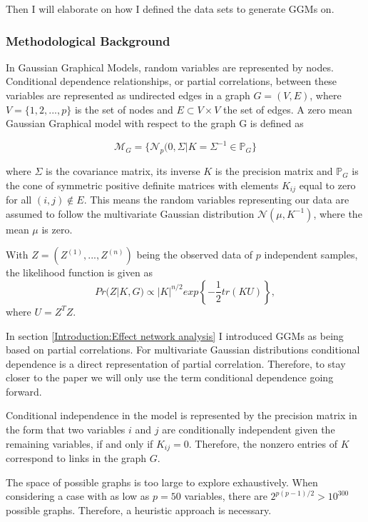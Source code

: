 \documentclass[a4paper,12pt,twoside,openright]{article}
\begin{document}
Then I will elaborate on how I defined the data sets to generate GGMs on.

\subsubsection{Methodological Background}
In Gaussian Graphical Models, random variables are represented by nodes. Conditional dependence relationships, or partial correlations,  between these variables are represented as undirected edges in a graph $G=(V,E)$, where $V=\{1,2, ..., p\}$ is the set of nodes and $E \subset V \times V$ the set of edges. A zero mean Gaussian Graphical model with respect to the graph G is defined as

\begin{equation}
\mathcal{M}_G = \lbrace \mathcal{N}_p(0,\Sigma|K = \Sigma^{-1} \in \mathbb{P}_G \rbrace
\end{equation}

where $\Sigma$ is the covariance matrix, its inverse $K$ is the precision matrix and $\mathbb{P}_G$ is the cone of symmetric positive definite matrices with elements $K_{ij}$ equal to zero for all $(i,j)\notin E$. This means the random variables representing our data are assumed to follow the multivariate Gaussian distribution $\mathcal{N}(\mu, K^{-1})$, where the mean $\mu$ is zero.

With $Z = (Z^{(1)}, ..., Z^{(n)})$ being the observed data of $p$ independent samples, the likelihood function is given as
\begin{equation}
Pr(Z|K,G) \propto |K|^{n/2} exp\left\lbrace-\frac{1}{2}tr(KU)\right\rbrace,
\end{equation}
where $U = Z^TZ$.

In section \ref{Introduction:Effect network analysis} I introduced GGMs as being based on partial correlations. For multivariate Gaussian distributions conditional dependence is a direct representation of partial correlation\cite{10.1111/j.1467-842X.2004.00360.x}. Therefore, to stay closer to the paper we will only use the term conditional dependence going forward.

Conditional independence in the model is represented by the precision matrix in the form that two variables $i$ and $j$ are conditionally independent given the remaining variables, if and only if $K_{ij} = 0$. Therefore, the nonzero entries of $K$ correspond to links in the graph $G$.  

The space of possible graphs is too large to explore exhaustively. When considering a case with as low as $p = 50$ variables, there are $2^{p(p-1)/2} > 10^{300}$ possible graphs. Therefore, a heuristic approach is necessary. 
\end{document}
